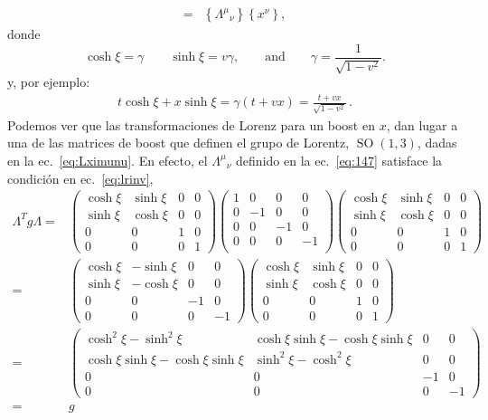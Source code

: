 \begin{frame}
\begin{align}
=&\left\{{\Lambda^\mu}_{\nu}\right\}\left\{x^\nu\right\},
\end{align}
donde
\begin{equation}
  \cosh\xi=\gamma\qquad\sinh\xi=v\gamma,\qquad\text{and}\qquad \gamma=\frac{1}{\sqrt{1-v^2}}.
\end{equation}
y, por ejemplo:
\begin{align}
  t\cosh{\xi}+x\sinh\xi=\gamma(t+v x)=\frac{t+v x}{\sqrt{1-v^2}}\,.
\end{align}
Podemos ver que las transformaciones de Lorenz para un boost en $x$, dan lugar a una de las matrices de boost que definen el grupo de Lorentz, $\operatorname{SO}(1,3)$, dadas en la ec.~\eqref{eq:Lximunu}. En efecto, el ${\Lambda^\mu}_{\nu}$ definido en la ec.~\eqref{eq:147} satisface la condición en ec.~\eqref{eq:lrinv}, 
\begin{align}
  \label{eq:boostx}
  \Lambda^T g \Lambda=&\begin{pmatrix}
    \cosh\xi&\sinh\xi&0&0\\
    \sinh\xi&\cosh\xi&0&0\\
    0     &  0  &1&0\\
    0     &  0  &0&1
  \end{pmatrix}
  \begin{pmatrix}
    1 & 0  & 0 &0\\
    0 & -1 & 0 &0\\
    0 & 0  & -1&0\\
    0 & 0  & 0 &-1\\
  \end{pmatrix}
  \begin{pmatrix}
    \cosh\xi&\sinh\xi&0&0\\
    \sinh\xi&\cosh\xi&0&0\\
    0     &  0  &1&0\\
    0     &  0  &0&1
  \end{pmatrix}\nonumber\\
  =&\begin{pmatrix}
       \cosh\xi&-\sinh\xi&0&0\\
    \sinh\xi&-\cosh\xi&0&0\\
    0     &  0  &-1&0\\
    0     &  0  &0&-1
  \end{pmatrix}
 \begin{pmatrix}
    \cosh\xi&\sinh\xi&0&0\\
    \sinh\xi&\cosh\xi&0&0\\
    0     &  0  &1&0\\
    0     &  0  &0&1
  \end{pmatrix}\nonumber\\
  =&\begin{pmatrix}
       \cosh^2\xi-\sinh^2\xi&\cosh\xi\sinh\xi-\cosh\xi\sinh\xi&0&0\\
    \cosh\xi\sinh\xi-\cosh\xi\sinh\xi&\sinh^2\xi-\cosh^2\xi&0&0\\
    0     &  0  &-1&0\\
    0     &  0  &0&-1
  \end{pmatrix}\nonumber\\
=&g
\end{align}
\end{frame}
